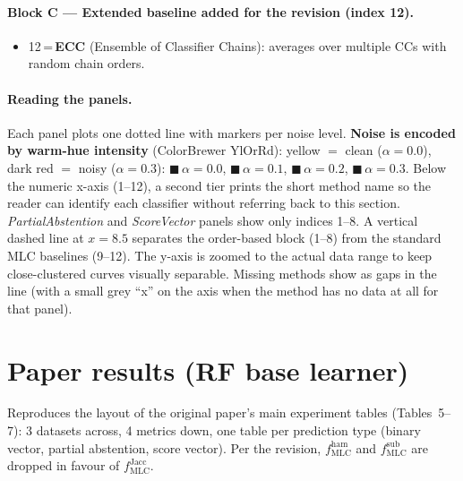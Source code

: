\documentclass[11pt]{article}
\begin{document}
\paragraph{Block C --- Extended baseline added for the revision
(index 12).}
\begin{itemize}
  \item 12\,=\,\textbf{ECC} (Ensemble of Classifier Chains): averages over
        multiple CCs with random chain orders.
\end{itemize}

\paragraph{Reading the panels.} Each panel plots one dotted line with
markers per noise level. \textbf{Noise is encoded by warm-hue intensity}
(ColorBrewer YlOrRd): yellow $=$ clean ($\alpha=0.0$), dark red $=$ noisy
($\alpha=0.3$):
\textcolor[HTML]{fecc5c}{$\blacksquare$}\,$\alpha=0.0$,
\textcolor[HTML]{fd8d3c}{$\blacksquare$}\,$\alpha=0.1$,
\textcolor[HTML]{f03b20}{$\blacksquare$}\,$\alpha=0.2$,
\textcolor[HTML]{bd0026}{$\blacksquare$}\,$\alpha=0.3$.
Below the numeric x-axis (1--12), a second tier prints the short method
name so the reader can identify each classifier without referring back to
this section. \emph{PartialAbstention} and \emph{ScoreVector} panels show
only indices 1--8. A vertical dashed line at $x=8.5$ separates the
order-based block (1--8) from the standard MLC baselines (9--12). The
y-axis is zoomed to the actual data range to keep close-clustered curves
visually separable. Missing methods show as gaps in the line (with a
small grey ``x'' on the axis when the method has no data at all for that
panel).

\clearpage

\section{Paper results (RF base learner)}

Reproduces the layout of the original paper's main experiment tables (Tables~5--7): 3 datasets across, 4 metrics down, one table per prediction type (binary vector, partial abstention, score vector). Per the revision, $f^{\mathrm{ham}}_{\mathrm{MLC}}$ and $f^{\mathrm{sub}}_{\mathrm{MLC}}$ are dropped in favour of $f^{\mathrm{Jacc}}_{\mathrm{MLC}}$.


\end{document}
